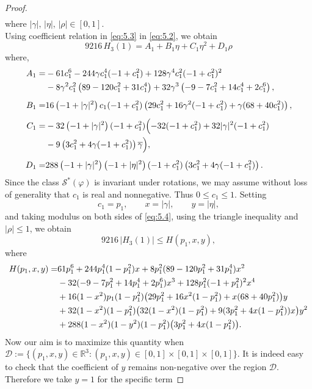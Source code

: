 \documentclass[10pt,a4paper]{amsart}
\begin{document}
\begin{proof}
\begin{align}
\end{align}
where $|\gamma|,\,  |\eta|,\,  |\rho| \in [0, 1].$\\[2mm]
Using coefficient relation in \eqref{eq:5.3} in \eqref{eq:5.2}, we obtain
\begin{equation}\label{eq:5.4}
	9216 \, H_{3}(1)=A_{1}+B_{1} \eta +C_{1}\eta^2+D_{1}\rho
\end{equation}
where,
\begin{align*}
	A_1=&-61c_1^6-244\gamma c_1^4(-1+c_1^2)+128\gamma^4c_1^2(-1+c_1^2)^2 \\
	\quad &-8\gamma^2c_1^2\left(89-120c_1^2+31c_1^4\right)
	+32\gamma^3\left(-9-7c_1^2+14c_1^4+2c_1^6\right),\\[0.5em]
	B_1=&16\left(-1+|\gamma|^2\right)c_1(-1+c_1^2)
	\left(29c_1^2+16\gamma^2(-1+c_1^2)+\gamma(68+40c_1^2)\right),\\[0.5em]
	C_1=&-32\left(-1+|\gamma|^2\right)(-1+c_1^2)
	\Bigl(-32(-1+c_1^2)+32|\gamma|^2(-1+c_1^2) \\
	\quad &-9\left(3c_1^2+4\gamma(-1+c_1^2)\right)\overline{\gamma}\Bigr),\\[0.5em]
	D_1=&288\left(-1+|\gamma|^2\right)\left(-1+|\eta|^2\right)(-1+c_1^2)
	\left(3c_1^2+4\gamma(-1+c_1^2)\right).
\end{align*}
Since the class $\mathcal{S}^*(\varphi)$ is invariant under rotations, we may assume without loss of generality that $c_1$ is real and nonnegative. Thus
$
0\le c_1\le 1.
$
Setting
\[
c_1=p_1,\qquad x=|\gamma|,\qquad y=|\eta|,
\]
and taking modulus on both sides of \eqref{eq:5.4}, using the triangle inequality and $|\rho|\le 1$, we obtain
\[
9216\,|H_3(1)|\le H(p_1,x,y),
\]
where 
\begin{align}
	H(p_1,x,y)=&61p_1^6+244p_1^4(1-p_1^2)x
	+8p_1^2(89-120p_1^2+31p_1^4)x^2 \notag\\
	\quad
	&-32(-9-7p_1^2+14p_1^4+2p_1^6)x^3
	+128p_1^2(-1+p_1^2)^2x^4 \notag\\
	\quad
	&+16(1-x^2)p_1(1-p_1^2)\bigl(29p_1^2+16x^2(1-p_1^2)+x(68+40p_1^2)\bigr)y \notag\\
	\quad
	&+32(1-x^2)(1-p_1^2)\bigl(32(1-x^2)(1-p_1^2)+9(3p_1^2+4x(1-p_1^2))x\bigr)y^2 \notag\\
	\quad
	&+288(1-x^2)(1-y^2)(1-p_1^2)\bigl(3p_1^2+4x(1-p_1^2)\bigr).
\end{align}
Now our aim is to maximize this quantity when $\mathcal{D}:=\{(p_1, x, y)\in \mathbb{R}^3:(p_1,x,y)\in [0,1]\times[0, 1]\times[0, 1]\}.$
It is indeed easy to check that the coefficient of $y$ remains non-negative over the region $\mathcal{D}.$ Therefore we take $y=1$ for the specific term 

\end{proof}
\end{document}
